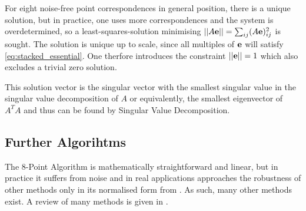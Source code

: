 For eight noise-free point correspondences in general position, there is a
unique solution, but in practice, one uses more correspondences and the system
is overdetermined, so a least-squares-solution minimising $\vert\vert A\mathbf{e}
\vert\vert = \sum_{ij} (A\mathbf{e})_{ij}^2$ is sought. 
The solution is unique up to scale, since all multiples of $\mathbf{e}$ will
satisfy \eqref{eq:stacked_essential}. One therfore introduces the constraint
$\vert\vert \mathbf{e} \vert\vert = 1$ which also excludes a trivial zero solution.

This solution vector is the singular
vector with the smallest singular value in the singular value decomposition of
$A$ or equivalently, the smallest eigenvector of $A^TA$ \citep[see]{hartley1997}
and thus can be found by Singular Value Decomposition.

\subsection{Further Algorihtms}

The 8-Point Algorithm is mathematically straightforward and linear, but in
practice it suffers from noise \citep[e.g.][see]{chen2000} and in real
applications approaches the robustness of other methods only in its normalised
form from \citep{hartley1997}. As such, many other methods exist. A review of
many methods is given in \citep{zhang1998}.
